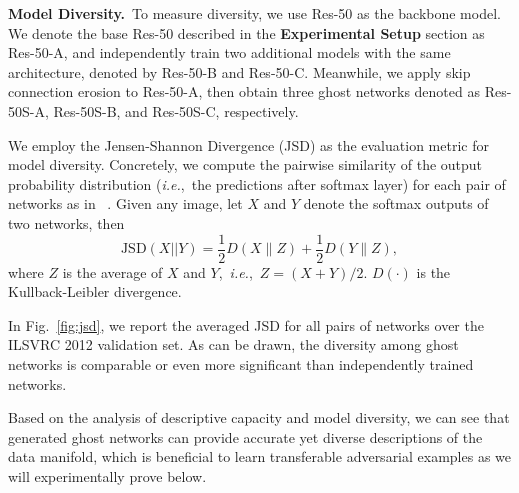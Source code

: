\documentclass[letterpaper]{article} %
\newcommand{\citet}[1]{\citeauthor{#1} \shortcite{#1}}
\def\ie{\emph{i.e.}}
\begin{document}
\vspace{1ex}\noindent\textbf{Model Diversity.}~To measure diversity, we use Res-50 as the backbone model. We denote the base Res-50 described in the \textbf{Experimental Setup} section as Res-50-A, and independently train two additional models with the same architecture, denoted by Res-50-B and Res-50-C. Meanwhile, we apply skip connection erosion to Res-50-A, then obtain three ghost networks denoted as Res-50S-A, Res-50S-B, and Res-50S-C, respectively.

We employ the Jensen-Shannon Divergence (JSD) as the evaluation metric for model diversity. Concretely, we compute the pairwise similarity of the output probability distribution (\ie,~the predictions after softmax layer) for each pair of networks as in~\citet{huang2017snapshot}. Given any image, let $X$ and $Y$ denote the softmax outputs of two networks, then
\begin{equation}
\text{JSD}(X||Y)=\frac{1}{2}D(X\|Z)+\frac{1}{2}D(Y\|Z),
\end{equation}
where $Z$ is the average of $X$ and $Y$,~\ie,~$Z=(X+Y)/2$. $D(\cdot)$ is the Kullback-Leibler divergence. 

In Fig.~\ref{fig:jsd}, we report the averaged JSD for all pairs of networks over the ILSVRC 2012 validation set. As can be drawn, the diversity among ghost networks is comparable or even more significant than independently trained networks.


Based on the analysis of descriptive capacity and model diversity, we can see that generated ghost networks can provide accurate yet diverse descriptions of the data manifold, which is beneficial to learn transferable adversarial examples as we will experimentally prove below.
\end{document}
